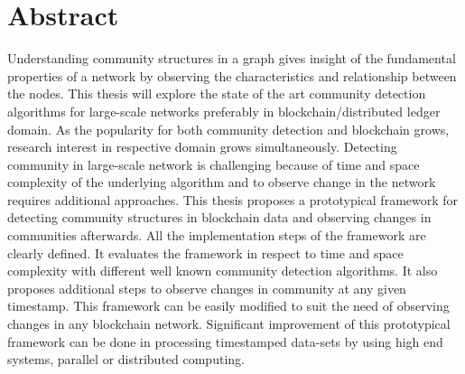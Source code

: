 \chapter*{Abstract}
\label{cha:abstract}

Understanding community structures in a graph gives insight of the fundamental properties of a network by observing the characteristics and relationship between the nodes. This thesis will explore the state of the art community detection algorithms for large-scale networks preferably in blockchain/distributed ledger domain. As the popularity for both community detection and blockchain grows, research interest in respective domain grows simultaneously. Detecting community in large-scale network is challenging because of time and space complexity of the underlying algorithm and to observe change in the network requires additional approaches. This thesis proposes a prototypical framework for detecting community structures in blockchain data and observing changes in communities afterwards. All the implementation steps of the framework are clearly defined. It evaluates the framework in respect to time and space complexity with different well known community detection algorithms. It also proposes additional steps to observe changes in community at any given timestamp. This framework can be easily modified to suit the need of observing changes in any blockchain network. Significant improvement of this prototypical framework can be done in processing timestamped data-sets by using high end systems, parallel or distributed computing.

